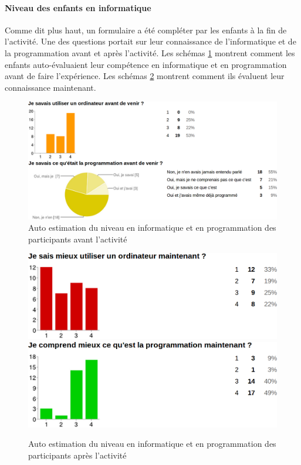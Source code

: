 \paragraph{Niveau des enfants en informatique}
Comme dit plus haut, un formulaire a été compléter par les enfants à la fin de l'activité. Une des questions portait sur leur connaissance de l'informatique et de la programmation avant et après l'activité. Les schémas \ref{fig:niveau-avant} montrent comment les enfants auto-évaluaient leur compétence en informatique et en programmation avant de faire l'expérience. Les schémas \ref{fig:niveau-apres} montrent comment ils évaluent leur connaissance maintenant.
\begin{figure}[]
  \begin{center}
    \includegraphics[width=\textwidth]{content/8-validation/images/avant-programmation}
    \caption{Auto estimation du niveau en informatique et en programmation des participants avant l'activité}
    \label{fig:niveau-avant}
  \end{center}
\end{figure}
\begin{figure}[]
  \begin{center}
    \includegraphics[width=\textwidth]{content/8-validation/images/apres}
    \includegraphics[width=\textwidth]{content/8-validation/images/apres-programmation}
    \caption{Auto estimation du niveau en informatique et en programmation des participants après l'activité}
    \label{fig:niveau-apres}
  \end{center}
\end{figure}

